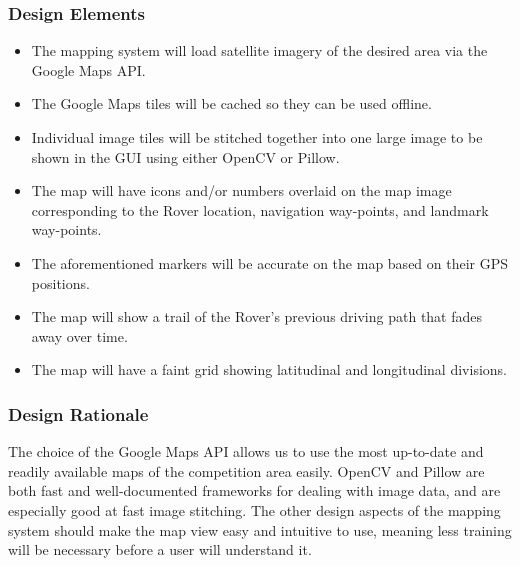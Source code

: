 \subsubsection{Design Elements}
\begin{itemize}
\item The mapping system will load satellite imagery of the desired area via the Google Maps API.
\item The Google Maps tiles will be cached so they can be used offline.
\item Individual image tiles will be stitched together into one large image to be shown in the GUI using either OpenCV or Pillow.
\item The map will have icons and/or numbers overlaid on the map image corresponding to the Rover location, navigation way-points, and landmark way-points.
\item The aforementioned markers will be accurate on the map based on their GPS positions.
\item The map will show a trail of the Rover's previous driving path that fades away over time.
\item The map will have a faint grid showing latitudinal and longitudinal divisions.
\end{itemize}

\subsubsection{Design Rationale}
The choice of the Google Maps API allows us to use the most up-to-date and readily available maps of the competition area easily.
OpenCV and Pillow are both fast and well-documented frameworks for dealing with image data, and are especially good at fast image stitching.
The other design aspects of the mapping system should make the map view easy and intuitive to use, meaning less training will be necessary before a user will understand it.